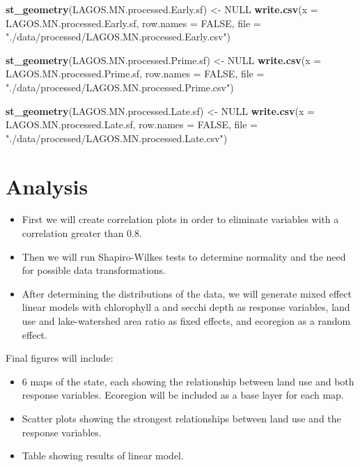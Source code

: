 \documentclass[12pt,]{article}
\newenvironment{Shaded}{\begin{snugshade}}{\end{snugshade}}
\newcommand{\DataTypeTok}[1]{\textcolor[rgb]{0.13,0.29,0.53}{#1}}
\newcommand{\KeywordTok}[1]{\textcolor[rgb]{0.13,0.29,0.53}{\textbf{#1}}}
\newcommand{\NormalTok}[1]{#1}
\newcommand{\OtherTok}[1]{\textcolor[rgb]{0.56,0.35,0.01}{#1}}
\newcommand{\StringTok}[1]{\textcolor[rgb]{0.31,0.60,0.02}{#1}}
\providecommand{\tightlist}{%
  \setlength{\itemsep}{0pt}\setlength{\parskip}{0pt}}
\begin{document}
\begin{Shaded}
\begin{Highlighting}[]
\KeywordTok{st_geometry}\NormalTok{(LAGOS.MN.processed.Early.sf) <-}\StringTok{ }\OtherTok{NULL}
\KeywordTok{write.csv}\NormalTok{(}\DataTypeTok{x =}\NormalTok{  LAGOS.MN.processed.Early.sf, }\DataTypeTok{row.names =} \OtherTok{FALSE}\NormalTok{,}
          \DataTypeTok{file =}  \StringTok{"./data/processed/LAGOS.MN.processed.Early.csv"}\NormalTok{)}

\KeywordTok{st_geometry}\NormalTok{(LAGOS.MN.processed.Prime.sf) <-}\StringTok{ }\OtherTok{NULL}
\KeywordTok{write.csv}\NormalTok{(}\DataTypeTok{x =}\NormalTok{  LAGOS.MN.processed.Prime.sf, }\DataTypeTok{row.names =} \OtherTok{FALSE}\NormalTok{,}
          \DataTypeTok{file =}  \StringTok{"./data/processed/LAGOS.MN.processed.Prime.csv"}\NormalTok{)}

\KeywordTok{st_geometry}\NormalTok{(LAGOS.MN.processed.Late.sf) <-}\StringTok{ }\OtherTok{NULL}
\KeywordTok{write.csv}\NormalTok{(}\DataTypeTok{x =}\NormalTok{  LAGOS.MN.processed.Late.sf, }\DataTypeTok{row.names =} \OtherTok{FALSE}\NormalTok{,}
          \DataTypeTok{file =}  \StringTok{"./data/processed/LAGOS.MN.processed.Late.csv"}\NormalTok{)}
\end{Highlighting}
\end{Shaded}

\newpage

\hypertarget{analysis}{%
\section{Analysis}\label{analysis}}

\begin{itemize}
\tightlist
\item
  First we will create correlation plots in order to eliminate variables
  with a correlation greater than 0.8.
\item
  Then we will run Shapiro-Wilkes tests to determine normality and the
  need for possible data transformations.
\item
  After determining the distributions of the data, we will generate
  mixed effect linear models with chlorophyll a and secchi depth as
  response variables, land use and lake-watershed area ratio as fixed
  effects, and ecoregion as a random effect.
\end{itemize}

Final figures will include:

\begin{itemize}
\tightlist
\item
  6 maps of the state, each showing the relationship between land use
  and both response variables. Ecoregion will be included as a base
  layer for each map.
\item
  Scatter plots showing the strongest relationships between land use and
  the response variables.
\item
  Table showing results of linear model.
\end{itemize}
\end{document}
